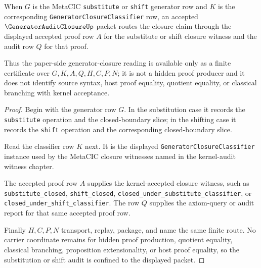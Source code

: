\begin{theorem}
\label{thm:generator-audit-closure-substitution-shift-audit}
When $G$ is the MetaCIC \texttt{substitute} or \texttt{shift} generator row and $K$ is the corresponding \texttt{GeneratorClosureClassifier} row, an accepted $\GeneratorAuditClosureUp$ packet routes the closure claim through the displayed accepted proof row $A$ for the substitute or shift closure witness and the audit row $Q$ for that proof.

Thus the paper-side generator-closure reading is available only as a finite certificate over $G,K,A,Q,H,C,P,N$; it is not a hidden proof producer and it does not identify source syntax, host proof equality, quotient equality, or classical branching with kernel acceptance.
\end{theorem}
\begin{proof}
Begin with the generator row $G$. In the substitution case it records the \texttt{substitute} operation and the closed-boundary slice; in the shifting case it records the \texttt{shift} operation and the corresponding closed-boundary slice.

Read the classifier row $K$ next. It is the displayed \texttt{GeneratorClosureClassifier} instance used by the MetaCIC closure witnesses named in the kernel-audit witness chapter.

The accepted proof row $A$ supplies the kernel-accepted closure witness, such as \texttt{substitute\_closed}, \texttt{shift\_closed}, \texttt{closed\_under\_substitute\_classifier}, or \texttt{closed\_under\_shift\_classifier}. The row $Q$ supplies the axiom-query or audit report for that same accepted proof row.

Finally $H,C,P,N$ transport, replay, package, and name the same finite route. No carrier coordinate remains for hidden proof production, quotient equality, classical branching, proposition extensionality, or host proof equality, so the substitution or shift audit is confined to the displayed packet.
\end{proof}

